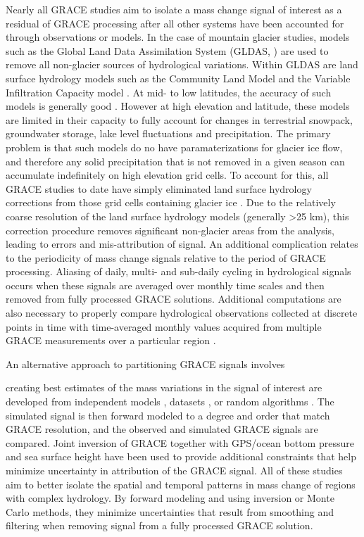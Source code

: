 \documentclass[review,oneside]{igs}
\begin{document}
Nearly all GRACE studies aim to isolate a mass change signal of interest as a residual of GRACE processing after all other systems have been accounted for through observations or models. In the case of mountain glacier studies, models such as the Global Land Data Assimilation System (GLDAS, \citep{rodell_global_2004}) are used to remove all non-glacier sources of hydrological variations. Within GLDAS are land surface hydrology models such as the Community Land Model \citep{oleson2010technical} and the Variable Infiltration Capacity model \citep{liang1994simple}. At mid- to low latitudes, the accuracy of such models is generally good \citep[e.g.][]{werth_integration_2009}. However at high elevation and latitude, these models are limited in their capacity to fully account for changes in terrestrial snowpack, groundwater storage, lake level fluctuations and precipitation. The primary problem is that such models do no have paramaterizations for glacier ice flow, and therefore any solid precipitation that is not removed in a given season can accumulate indefinitely on high elevation grid cells. To account for this, all GRACE studies to date have simply eliminated land surface hydrology corrections from those grid cells containing glacier ice \citep[e.g.][]{gardner_sharply_2011,jacob_recent_2012,luthcke_antarctica_2013}. Due to the relatively coarse resolution of the land surface hydrology models (generally >25 km), this correction procedure removes significant non-glacier areas from the analysis, leading to errors and mis-attribution of signal. An additional complication relates to the periodicity of mass change signals relative to the period of GRACE processing. Aliasing of daily, multi- and sub-daily cycling in hydrological signals occurs when these signals are averaged over monthly time scales and then removed from fully processed GRACE solutions. Additional computations are also necessary to properly compare hydrological observations collected at discrete points in time with time-averaged monthly values acquired from multiple GRACE measurements over a particular region \citep{swenson_estimating_2006,hill_spatial_2015}. 

An alternative approach to partitioning GRACE signals involves 

creating best estimates of the mass variations in the signal of interest are developed from independent models \citep{beamer_high-resolution_2016}, datasets \citep{sasgen_towards_2012}, or random algorithms \citep{gardner_sharply_2011,colgan_constraining_2013}. The simulated signal is then forward modeled to a degree and order that match GRACE resolution, and the observed and simulated GRACE signals are compared. Joint inversion of GRACE together with GPS/ocean bottom pressure \citep{wu_simultaneous_2010} and sea surface height \citep{jensen_land_2013} have been used to provide additional constraints that help minimize uncertainty in attribution of the GRACE signal. All of these studies aim to better isolate the spatial and temporal patterns in mass change of regions with complex hydrology. By forward modeling and using inversion or Monte Carlo methods, they minimize uncertainties that result from smoothing and filtering when removing signal from a fully processed GRACE solution.
\end{document}
